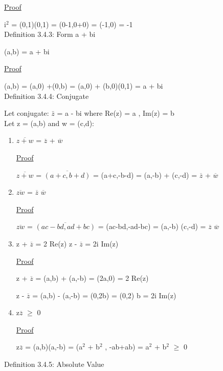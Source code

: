 { \color{magenta} \underline{Proof} } 
	
	i$^\text{2}$ = (0,1)(0,1) = (0-1,0+0) = (-1,0) = -1 \\

{ \color{blue} Definition 3.4.3: Form a + bi } 
	
	\qquad (a,b) = a + bi

{ \color{magenta} \underline{Proof} } 
	
	(a,b) = (a,0) +(0,b) = (a,0) + (b,0)(0,1) = a + bi \\

{ \color{blue} Definition 3.4.4: Conjugate }
	
	\qquad Let conjugate: $\bar{z}$ = a - bi where Re(z) = a , Im(z) = b \\

	\qquad Let z = (a,b) and w = (c,d):
	\begin{enumerate}[label=(\alph*), leftmargin=2cm, itemsep=0.4em]
		\item $\overline{z+w}$ = $\overline{z}$ + $\overline{w}$

			{ \color{magenta} \underline{Proof} } 
			
				$\overline{z+w}$ = $\overline{(a+c,b+d)}$ = (a+c,-b-d)
				= (a,-b) + (c,-d) = $\overline{z}$ + $\overline{w}$

		\item $\overline{zw}$ = $\overline{z}$ $\overline{w}$

			{ \color{magenta} \underline{Proof} } 
			
				$\overline{zw}$ = $\overline{(ac-bd,ad+bc)}$ = (ac-bd,-ad-bc)
				= (a,-b) (c,-d) = $\overline{z}$ $\overline{w}$

		\item z + $\overline{z}$ = 2 Re(z) \qquad \qquad z - $\overline{z}$ = 2i Im(z)

			{ \color{magenta} \underline{Proof} } 
			
				z + $\overline{z}$ = (a,b) + (a,-b) = (2a,0) = 2 Re(z)

				z - $\overline{z}$ = (a,b) - (a,-b) = (0,2b) = (0,2) b = 2i Im(z)

		\item z$\overline{z}$ $\geq$ 0

			{ \color{magenta} \underline{Proof} } 
			
				z$\overline{z}$ = (a,b)(a,-b) = (a$^2$ + b$^2$ , -ab+ab) = a$^2$ + b$^2$ $\geq$ 0
	\end{enumerate}

{ \color{blue} Definition 3.4.5: Absolute Value } 
	
